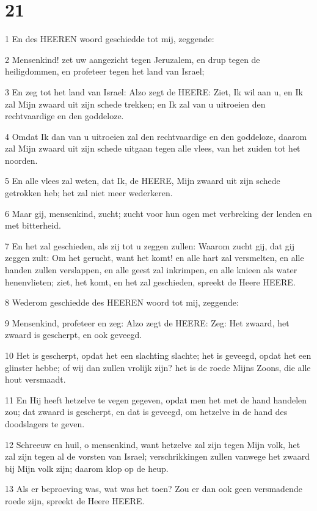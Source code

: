 \chapter{21}

\par 1 En des HEEREN woord geschiedde tot mij, zeggende:
\par 2 Mensenkind! zet uw aangezicht tegen Jeruzalem, en drup tegen de heiligdommen, en profeteer tegen het land van Israel;
\par 3 En zeg tot het land van Israel: Alzo zegt de HEERE: Ziet, Ik wil aan u, en Ik zal Mijn zwaard uit zijn schede trekken; en Ik zal van u uitroeien den rechtvaardige en den goddeloze.
\par 4 Omdat Ik dan van u uitroeien zal den rechtvaardige en den goddeloze, daarom zal Mijn zwaard uit zijn schede uitgaan tegen alle vlees, van het zuiden tot het noorden.
\par 5 En alle vlees zal weten, dat Ik, de HEERE, Mijn zwaard uit zijn schede getrokken heb; het zal niet meer wederkeren.
\par 6 Maar gij, mensenkind, zucht; zucht voor hun ogen met verbreking der lenden en met bitterheid.
\par 7 En het zal geschieden, als zij tot u zeggen zullen: Waarom zucht gij, dat gij zeggen zult: Om het gerucht, want het komt! en alle hart zal versmelten, en alle handen zullen verslappen, en alle geest zal inkrimpen, en alle knieen als water henenvlieten; ziet, het komt, en het zal geschieden, spreekt de Heere HEERE.
\par 8 Wederom geschiedde des HEEREN woord tot mij, zeggende:
\par 9 Mensenkind, profeteer en zeg: Alzo zegt de HEERE: Zeg: Het zwaard, het zwaard is gescherpt, en ook geveegd.
\par 10 Het is gescherpt, opdat het een slachting slachte; het is geveegd, opdat het een glinster hebbe; of wij dan zullen vrolijk zijn? het is de roede Mijns Zoons, die alle hout versmaadt.
\par 11 En Hij heeft hetzelve te vegen gegeven, opdat men het met de hand handelen zou; dat zwaard is gescherpt, en dat is geveegd, om hetzelve in de hand des doodslagers te geven.
\par 12 Schreeuw en huil, o mensenkind, want hetzelve zal zijn tegen Mijn volk, het zal zijn tegen al de vorsten van Israel; verschrikkingen zullen vanwege het zwaard bij Mijn volk zijn; daarom klop op de heup.
\par 13 Als er beproeving was, wat was het toen? Zou er dan ook geen versmadende roede zijn, spreekt de Heere HEERE.
